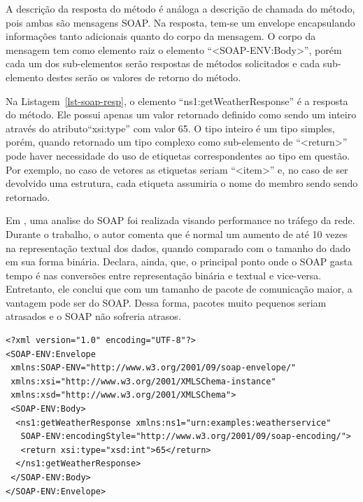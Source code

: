 A descrição da resposta do método é análoga a descrição de chamada do
método, pois ambas são mensagens SOAP. Na resposta, tem-se um envelope
encapsulando informações tanto adicionais quanto do corpo da mensagem.
O corpo da mensagem tem como elemento raiz o elemento ``<SOAP-ENV:Body>'',
porém cada um dos sub-elementos serão respostas de métodos solicitados
e cada sub-elemento destes serão os valores de retorno do método.

Na Listagem~\ref{lst-soap-resp}, o elemento ``ns1:getWeatherResponse'' é a
resposta do método.
Ele possui apenas um valor retornado definido
como sendo um inteiro através do atributo``xsi:type'' com valor 65. O tipo
inteiro é um tipo simples, porém, quando retornado um tipo complexo como
sub-elemento de ``<return>'' pode haver necessidade do uso de etiquetas
correspondentes ao tipo em questão.
Por exemplo, no caso de vetores as etiquetas seriam
``<item>'' e, no caso de ser devolvido uma estrutura, cada etiqueta assumiria
o nome do membro sendo sendo retornado.

Em \cite{kohlhoff2003evaluating}, uma analise do SOAP foi realizada visando
performance no tráfego da rede. Durante o trabalho, o autor comenta
que é normal um aumento de até 10 vezes na representação textual
dos dados, quando comparado com o tamanho do dado em sua forma binária. Declara,
ainda, que, o principal ponto
onde o SOAP gasta tempo é nas conversões entre representação binária e
textual e vice-versa.
Entretanto, ele conclui que com um tamanho de pacote de comunicação maior, a
vantagem pode ser do SOAP.
Dessa forma, pacotes muito pequenos seriam atrasados e o SOAP
não sofreria atrasos.

\lstset{linewidth=120mm}
\begin{center}
    \begin{minipage}{120mm}
	\begin{lstlisting}[frame=trbl, caption=Exemplo de chamada SOAP com os cabeçalhos HTTP sendo omitidos \cite{cerami2002web}., label=lst-soap-resp]
<?xml version="1.0" encoding="UTF-8"?>
<SOAP-ENV:Envelope
 xmlns:SOAP-ENV="http://www.w3.org/2001/09/soap-envelope/"
 xmlns:xsi="http://www.w3.org/2001/XMLSChema-instance"
 xmlns:xsd="http://www.w3.org/2001/XMLSChema">
 <SOAP-ENV:Body>
  <ns1:getWeatherResponse xmlns:ns1="urn:examples:weatherservice"
   SOAP-ENV:encodingStyle="http://www.w3.org/2001/09/soap-encoding/">
   <return xsi:type="xsd:int">65</return>
  </ns1:getWeatherResponse>
 </SOAP-ENV:Body>
</SOAP-ENV:Envelope>
	\end{lstlisting}
	\end{minipage}
\end{center}


